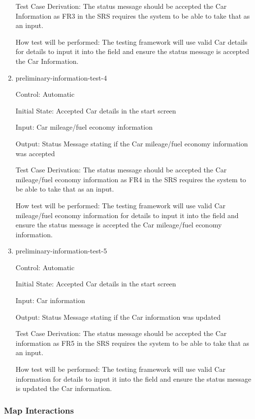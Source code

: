 \documentclass[12pt, titlepage]{article}
\begin{document}
\begin{enumerate}
Test Case Derivation: The status message should be accepted the Car Information as FR3 in the SRS 
requires the system to be able to take that as an input.
					
How test will be performed: The testing framework will use valid Car details for details to input 
it into the field and ensure the status message is accepted the Car Information.

\item{preliminary-information-test-4\\}

Control: Automatic
					
Initial State: Accepted Car details in the start screen
					
Input: Car mileage/fuel economy information
					
Output: Status Message stating if the Car mileage/fuel economy information was accepted

Test Case Derivation: The status message should be accepted the Car mileage/fuel economy information as FR4 in the SRS 
requires the system to be able to take that as an input.
					
How test will be performed: The testing framework will use valid Car mileage/fuel economy information for details to input 
it into the field and ensure the status message is accepted the Car mileage/fuel economy information.

\item{preliminary-information-test-5\\}

Control: Automatic
					
Initial State: Accepted Car details in the start screen
					
Input: Car information
					
Output: Status Message stating if the Car information was updated

Test Case Derivation: The status message should be accepted the Car information as FR5 in the SRS 
requires the system to be able to take that as an input.
					
How test will be performed: The testing framework will use valid Car information for details to input 
it into the field and ensure the status message is updated the Car information.

\end{enumerate}

\subsubsection{Map Interactions}
\end{document}
